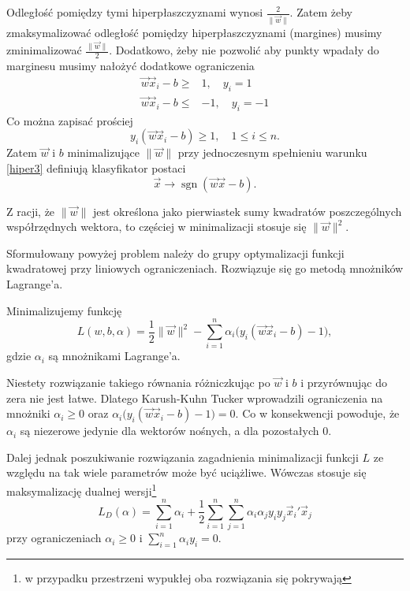 \documentclass[
]{book}
\theoremstyle{plain}
\theoremstyle{definition}
\theoremstyle{definition}
\theoremstyle{definition}
\theoremstyle{definition}
\theoremstyle{remark}
\begin{document}
Odległość pomiędzy tymi hiperpłaszczyznami wynosi \(\tfrac{2}{\|\vec{w}\|}\). Zatem żeby zmaksymalizować odległość pomiędzy hiperpłaszczyznami (margines) musimy zminimalizować \(\tfrac{\|\vec{w}\|}{2}\).
Dodatkowo, żeby nie pozwolić aby punkty wpadały do marginesu musimy nałożyć dodatkowe ograniczenia
\begin{align}
    \vec{w}\vec{x}_i-b\geq& 1, \quad   y_i=1\\
    \vec{w}\vec{x}_i-b\leq& -1, \quad y_i=-1
    \label{eq:hiper2}
\end{align}
Co można zapisać prościej
\begin{equation}
    y_i(\vec{w}\vec{x}_i-b)\geq 1,\quad 1\leq i\leq n.
    \label{eq:hiper3}
\end{equation}
Zatem \(\vec{w}\) i \(b\) minimalizujące \(\|\vec{w}\|\) przy jednoczesnym spełnieniu warunku \eqref{hiper3} definiują klasyfikator postaci
\begin{equation}
    \vec{x}\rightarrow \operatorname{sgn}(\vec{w}\vec{x}-b).
    \label{eq:hiper4}
\end{equation}

Z racji, że \(\|\vec{w}\|\) jest określona jako pierwiastek sumy kwadratów poszczególnych współrzędnych wektora, to częściej w minimalizacji stosuje się \(\|\vec{w}\|^2\).

Sformułowany powyżej problem należy do grupy optymalizacji funkcji kwadratowej przy liniowych ograniczeniach. Rozwiązuje się go metodą mnożników Lagrange'a.

Minimalizujemy funkcję
\begin{equation}
    L(w, b, \alpha) = \frac{1}{2}\|\vec{w}\|^2-\sum_{i=1}^{n}\alpha_i\big(y_i(\vec{w}\vec{x}_i-b)-1\big),
    \label{eq:lagrange}
\end{equation}
gdzie \(\alpha_i\) są mnożnikami Lagrange'a.

Niestety rozwiązanie takiego równania różniczkując po \(\vec{w}\) i \(b\) i przyrównując do zera nie jest łatwe. Dlatego Karush-Kuhn Tucker wprowadzili ograniczenia na mnożniki \(\alpha_i\geq 0\) oraz \(\alpha_i\big(y_i(\vec{w}\vec{x}_i-b)-1\big)=0\). Co w konsekwencji powoduje, że \(\alpha_i\) są niezerowe jedynie dla wektorów nośnych, a dla pozostałych 0.

Dalej jednak poszukiwanie rozwiązania zagadnienia minimalizacji funkcji \(L\) ze względu na tak wiele parametrów może być uciążliwe. Wówczas stosuje się maksymalizację dualnej wersji\footnote{w przypadku przestrzeni wypukłej oba rozwiązania się pokrywają}
\begin{equation}
    L_D(\alpha) = \sum_{i=1}^{n}\alpha_i+\frac{1}{2}\sum_{i=1}^{n}\sum_{j=1}^{n}\alpha_i\alpha_jy_iy_j\vec{x}_i'\vec{x}_j
    \label{eq:lagrange2}
\end{equation}
przy ograniczeniach \(\alpha_i\geq 0\) i \(\sum_{i=1}^{n}\alpha_iy_i=0\).
\end{document}

